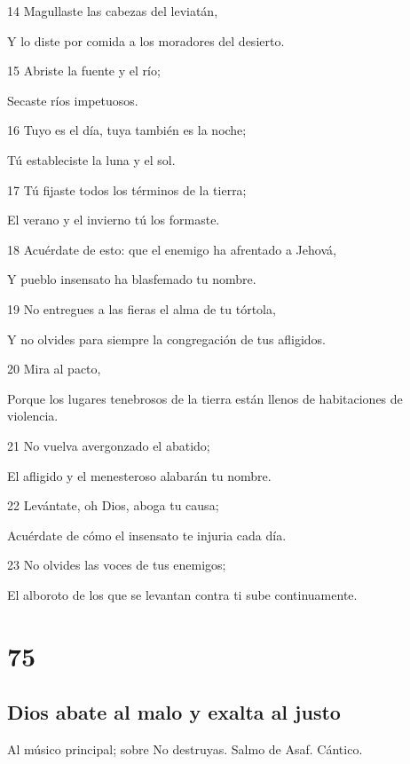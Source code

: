 \par 14 Magullaste las cabezas del leviatán,
\par Y lo diste por comida a los moradores del desierto.
\par 15 Abriste la fuente y el río;
\par Secaste ríos impetuosos.
\par 16 Tuyo es el día, tuya también es la noche;
\par Tú estableciste la luna y el sol.
\par 17 Tú fijaste todos los términos de la tierra;
\par El verano y el invierno tú los formaste.
\par 18 Acuérdate de esto: que el enemigo ha afrentado a Jehová,
\par Y pueblo insensato ha blasfemado tu nombre.
\par 19 No entregues a las fieras el alma de tu tórtola,
\par Y no olvides para siempre la congregación de tus afligidos.
\par 20 Mira al pacto,
\par Porque los lugares tenebrosos de la tierra están llenos de habitaciones de violencia.
\par 21 No vuelva avergonzado el abatido;
\par El afligido y el menesteroso alabarán tu nombre.
\par 22 Levántate, oh Dios, aboga tu causa;
\par Acuérdate de cómo el insensato te injuria cada día.
\par 23 No olvides las voces de tus enemigos;
\par El alboroto de los que se levantan contra ti sube continuamente.

\chapter{75}

\section*{Dios abate al malo y exalta al justo}

\par Al músico principal; sobre No destruyas. Salmo de Asaf. Cántico.

